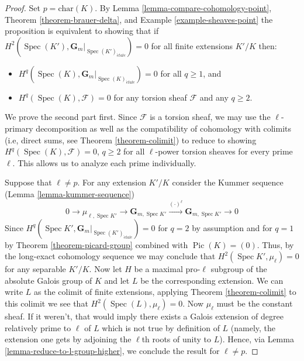 \documentclass[10pt,a4paper]{amsart}
\theoremstyle{plain}
\theoremstyle{definition}
\theoremstyle{remark}
\numberwithin{equation}{subsection}
\def\Spec{\mathop{\mathrm{Spec}}}
\def\etale{{\acute{e}tale}}
\def\Pic{\mathop{\mathrm{Pic}}\nolimits}
\begin{document}
\begin{proof}
Set $p = \text{char}(K)$.
By Lemma \ref{lemma-compare-cohomology-point},
Theorem \ref{theorem-brauer-delta},
and Example \ref{example-sheaves-point}
the proposition is equivalent to showing that if 
$H^2(\Spec(K'),\mathbf{G}_m|_{\Spec(K')_\etale}) = 0$
for all finite extensions $K'/K$ then:
\begin{itemize}
\item $H^q(\Spec(K),\mathbf{G}_m|_{\Spec(K)_\etale}) = 0$
for all $q \geq 1$, and
\item $H^q(\Spec(K),\mathcal{F}) = 0$
for any torsion sheaf $\mathcal{F}$ and any $q \geq 2$.
\end{itemize}
We prove the second part first.
Since $\mathcal{F}$ is a torsion sheaf, we may use the 
$\ell$-primary decomposition as well as the compatibility of
cohomology with colimits (i.e, direct sums, see Theorem \ref{theorem-colimit})
to reduce to showing  $H^q(\Spec(K),\mathcal{F}) = 0$, $q \geq 2$
for all $\ell$-power torsion sheaves for every prime $\ell$. This 
allows us to analyze each prime individually.

\medskip\noindent
Suppose that $\ell \neq p$. For any extension $K'/K$
consider the Kummer sequence (Lemma \ref{lemma-kummer-sequence})
$$
0 \to
\mu_{\ell, \Spec{K'}} \to
\mathbf{G}_{m, \Spec{K'}} \xrightarrow{(\cdot)^{\ell}}
\mathbf{G}_{m, \Spec{K'}} \to 0
$$
Since $H^q(\Spec{K'},\mathbf{G}_m|_{\Spec(K')_\etale}) = 0$
for $q = 2$ by assumption  and for $q = 1$ by
Theorem \ref{theorem-picard-group} combined with
$\Pic(K) = (0)$. Thus, by the long-exact cohomology 
sequence we may conclude that $H^2(\Spec{K'}, \mu_\ell) = 0$ for 
any separable $K'/K$. Now let $H$ be a maximal pro-$\ell$ subgroup
of the absolute Galois group of $K$ and let $L$ be the 
corresponding extension. We can write $L$ as the colimit of finite extensions, 
applying Theorem \ref{theorem-colimit} to this colimit we see that
$H^2(\Spec(L), \mu_\ell) = 0$.
Now $\mu_\ell$ must be the constant sheaf. If it weren't, that would imply
there exists a Galois extension of degree relatively prime to 
$\ell$ of $L$ which is not true by definition of $L$ (namely, the extension
one gets by adjoining the  $\ell$th roots of unity to $L$).
Hence, via Lemma \ref{lemma-reduce-to-l-group-higher},
we conclude the result for $\ell \neq p$. 


\end{proof}
\end{document}
